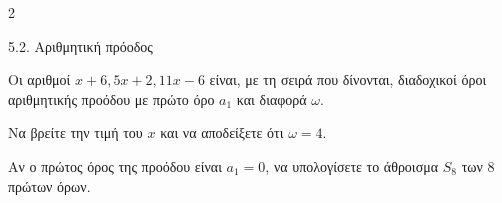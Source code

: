 \begin{ylh}{2}
    \item 5.2. Αριθμητική πρόοδος
\end{ylh}
Οι αριθμοί $x+6, 5x+2, 11x-6$ είναι, με τη σειρά που δίνονται, διαδοχικοί όροι αριθμητικής προόδου με πρώτο όρο $a_1$ και διαφορά $\omega$.

\begin{alist}
\item Να βρείτε την τιμή του $x$ και να αποδείξετε ότι $\omega=4$. 
\item Αν ο πρώτος όρος της προόδου είναι $a_1 = 0$, να υπολογίσετε το άθροισμα $S_8$ των 8 πρώτων όρων. 
\end{alist}

